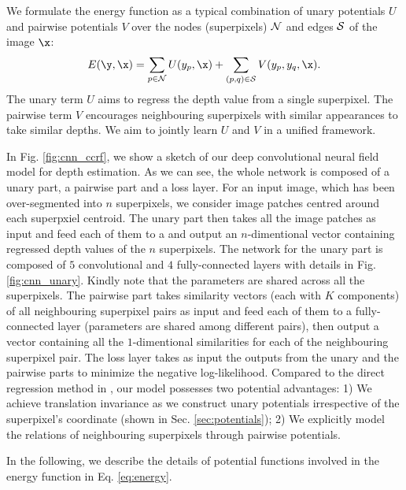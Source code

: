 We formulate the energy function as a typical combination of unary potentials $U$ and pairwise potentials $V$ over the nodes (superpixels) $\cal N$ and edges $\cal S$ of the image $\x$:
\begin{equation}\label{eq:energy}
E(\y, \x) = \sum_{p \in {\cal N} } U(y_{p}, \x) 
	 + \sum_{(p,q) \in {\cal S}} V(y_{p}, y_{q}, \x).
\end{equation}
The unary term $U$ aims to regress the depth value from a single superpixel. 
The pairwise term $V$ encourages neighbouring superpixels with similar appearances to take similar depths.
We aim to jointly learn $U$ and $V$ in a unified \cnn framework.

In Fig. \ref{fig:cnn_ccrf}, we show a sketch of our 
%
deep convolutional neural field model
for depth estimation.   
As we can see, the whole network is composed of a unary part, a pairwise part and a \crf loss layer.
For an input image, which has been over-segmented into $n$ superpixels, 
we consider image patches centred around each superpxiel centroid.
%
The unary part then takes  all the image patches as input and feed each of them to a \cnn 
and output an $n$-dimentional vector containing regressed depth values of the $n$ superpixels. 
The network for the unary part is composed of $5$ convolutional and $4$ fully-connected layers with details in Fig. \ref{fig:cnn_unary}. Kindly note that the \cnn parameters are shared across all the superpixels. 
The pairwise part %
takes similarity vectors (each with $K$ components)  of all neighbouring superpixel pairs as input and feed each of them to a fully-connected layer (parameters are shared among different pairs), then output a vector containing all the $1$-dimentional similarities for each of the neighbouring superpixel pair.
The \crf loss layer takes as input the outputs from the unary and the pairwise parts to minimize the negative log-likelihood.
Compared to the direct regression method in \cite{dcnn_nips14}, 
%
our model possesses two potential advantages: 
1) We achieve translation invariance as we construct unary potentials irrespective of the superpixel's coordinate (shown in Sec. \ref{sec:potentials});  
2) We explicitly model the relations of neighbouring superpixels through pairwise potentials.

 

In the following, we describe the details of potential functions involved in the energy function in Eq. \eqref{eq:energy}.








